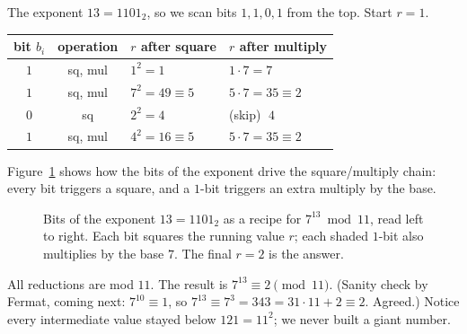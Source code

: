 \begin{example}
\label{ch30:ex-modexp}
The exponent $13 = 1101_2$, so we scan bits $1,1,0,1$ from the top. Start
$r = 1$.
\begin{center}
\begin{tabular}{c c l l}
\toprule
bit $b_i$ & operation & $r$ after square & $r$ after multiply \\
\midrule
$1$ & sq, mul & $1^2 = 1$              & $1\cdot 7 = 7$ \\
$1$ & sq, mul & $7^2 = 49 \equiv 5$    & $5\cdot 7 = 35 \equiv 2$ \\
$0$ & sq      & $2^2 = 4$              & (skip) $\;4$ \\
$1$ & sq, mul & $4^2 = 16 \equiv 5$    & $5\cdot 7 = 35 \equiv 2$ \\
\bottomrule
\end{tabular}
\end{center}
Figure~\ref{ch30:fig-modexp} shows how the bits of the exponent drive the
square/multiply chain: every bit triggers a square, and a $1$-bit triggers an
extra multiply by the base.

\begin{figure}[H]
\centering
{}
\caption{Bits of the exponent $13=1101_2$ as a recipe for $7^{13}\bmod 11$, read
left to right. Each bit squares the running value $r$; each shaded $1$-bit also
multiplies by the base $7$. The final $r=2$ is the answer.}
\label{ch30:fig-modexp}
\end{figure}

All reductions are mod $11$. The result is $7^{13} \equiv 2 \pmod{11}$. (Sanity
check by Fermat, coming next: $7^{10}\equiv 1$, so $7^{13}\equiv 7^3 = 343 = 31
\cdot 11 + 2 \equiv 2$. Agreed.) Notice every intermediate value stayed below
$121 = 11^2$; we never built a giant number.
\end{example}

